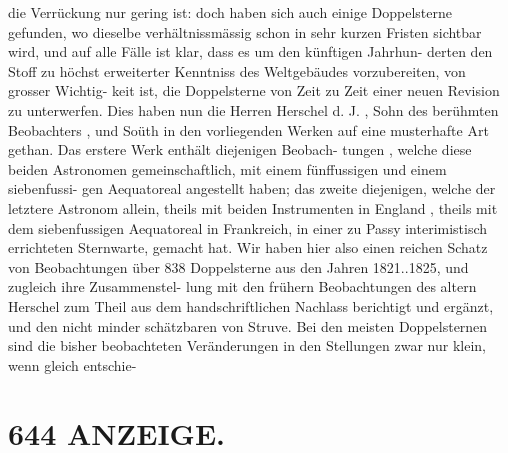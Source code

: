 \documentclass[12pt,a4paper]{article}
\begin{document}
{{{{{{{{die  Verrückung nur  gering  ist:  doch  haben  sich  auch  einige  Doppelsterne  gefunden,  wo  dieselbe  verhältnissmässig  schon in  sehr  kurzen  Fristen  sichtbar  wird,  und  auf  alle  Fälle  ist  klar,  dass  es  um  den  künftigen  Jahrhun- derten den  Stoff  zu  höchst  erweiterter  Kenntniss  des  Weltgebäudes  vorzubereiten,  von  grosser  Wichtig- keit ist,  die  Doppelsterne  von  Zeit  zu  Zeit  einer  neuen  Revision  zu  unterwerfen. Dies  haben  nun  die  Herren  Herschel  d.  J. ,  Sohn  des  berühmten  Beobachters ,  und  Soüth  in  den vorliegenden  Werken  auf  eine  musterhafte  Art  gethan.  Das  erstere  Werk  enthält  diejenigen  Beobach- tungen ,  welche  diese  beiden  Astronomen  gemeinschaftlich,  mit  einem  fünffussigen  und  einem  siebenfussi- gen  Aequatoreal  angestellt  haben;  das  zweite  diejenigen,  welche  der  letztere  Astronom  allein,  theils mit  beiden  Instrumenten  in  England ,  theils  mit  dem  siebenfussigen  Aequatoreal  in  Frankreich,  in  einer zu  Passy  interimistisch  errichteten  Sternwarte,  gemacht  hat.  Wir  haben  hier  also  einen  reichen  Schatz von  Beobachtungen  über  838  Doppelsterne  aus  den  Jahren  1821..1825,  und  zugleich  ihre  Zusammenstel- lung mit  den  frühern  Beobachtungen  des  altern  Herschel  zum  Theil  aus  dem  handschriftlichen  Nachlass berichtigt  und  ergänzt,  und  den  nicht  minder  schätzbaren  von  Struve.  Bei  den  meisten  Doppelsternen sind  die  bisher  beobachteten  Veränderungen  in  den  Stellungen  zwar  nur  klein,    wenn   gleich    entschie-


\section*{644  ANZEIGE.}

}}}}}}}}
\end{document}
